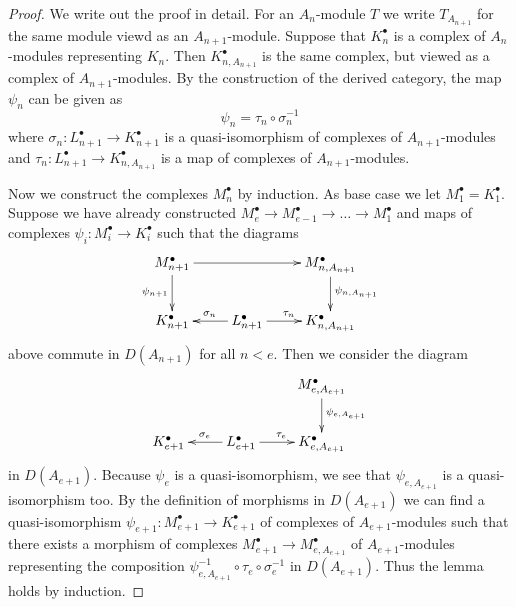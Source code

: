 \documentclass{amsart}
\theoremstyle{plain}
\theoremstyle{definition}
\theoremstyle{remark}
\numberwithin{equation}{subsection}
\begin{document}
\begin{proof}
We write out the proof in detail. For an $A_n$-module $T$ we write
$T_{A_{n + 1}}$ for the same module viewd as an $A_{n + 1}$-module.
Suppose that $K_n^\bullet$ is a complex of $A_n$-modules representing $K_n$.
Then $K_{n, A_{n + 1}}^\bullet$ is the same complex, but viewed as a
complex of $A_{n + 1}$-modules. By the construction of the derived
category, the map $\psi_n$ can be given as
$$
\psi_n = \tau_n \circ \sigma_n^{-1}
$$
where $\sigma_n : L_{n + 1}^\bullet \to K_{n + 1}^\bullet$
is a quasi-isomorphism of complexes of $A_{n + 1}$-modules
and $\tau_n : L_{n + 1}^\bullet \to K_{n, A_{n + 1}}^\bullet$
is a map of complexes of $A_{n + 1}$-modules.

\medskip\noindent
Now we construct the complexes $M_n^\bullet$ by induction. As base case
we let $M_1^\bullet = K_1^\bullet$. Suppose we have already constructed
$M_e^\bullet \to M_{e - 1}^\bullet \to \ldots \to M_1^\bullet$
and maps of complexes $\psi_i : M_i^\bullet \to K_i^\bullet$ such that
the diagrams
$$
\xymatrix{
M_{n + 1}^\bullet \ar[d]_{\psi_{n + 1}} \ar[rr] & &
M_{n, A_{n + 1}}^\bullet \ar[d]^{\psi_{n, A_{n + 1}}} \\
K_{n + 1}^\bullet & L_{n + 1}^\bullet \ar[l]_{\sigma_n} \ar[r]^{\tau_n} &
K_{n, A_{n + 1}}^\bullet
}
$$
above commute in $D(A_{n + 1})$ for all $n < e$. Then we consider the diagram
$$
\xymatrix{
& & M_{e, A_{e + 1}}^\bullet \ar[d]^{\psi_{e, A_{e + 1}}} \\
K_{e + 1}^\bullet & L_{e + 1}^\bullet \ar[r]^{\tau_e} \ar[l]_{\sigma_e} &
K_{e, A_{e + 1}}^\bullet
}
$$
in $D(A_{e + 1})$. Because $\psi_e$ is a quasi-isomorphism,
we see that $\psi_{e, A_{e + 1}}$ is a quasi-isomorphism too.
By the definition of morphisms in $D(A_{e + 1})$ we can
find a quasi-isomorphism
$\psi_{e + 1} : M_{e + 1}^\bullet \to K_{e + 1}^\bullet$
of complexes of $A_{e + 1}$-modules such that there exists a morphism
of complexes $M_{e + 1}^\bullet \to M_{e, A_{e + 1}}^\bullet$
of $A_{e + 1}$-modules representing the composition 
$\psi_{e, A_{e + 1}}^{-1} \circ \tau_e \circ \sigma_e^{-1}$
in $D(A_{e + 1})$. Thus the lemma holds by induction.
\end{proof}
\end{document}
